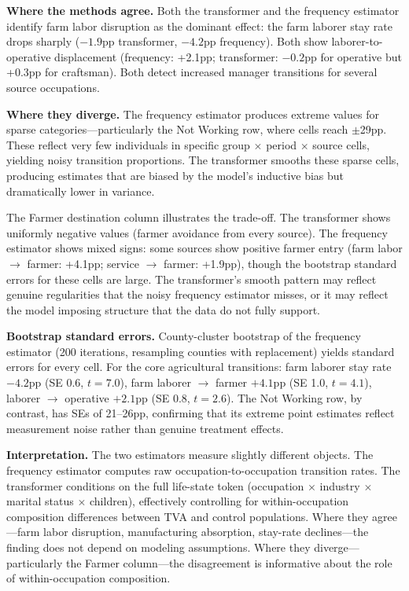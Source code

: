 \documentclass[12pt]{article}
\begin{document}
\textbf{Where the methods agree.} Both the transformer and the frequency estimator identify farm labor disruption as the dominant effect: the farm laborer stay rate drops sharply ($-1.9$pp transformer, $-4.2$pp frequency). Both show laborer-to-operative displacement (frequency: +2.1pp; transformer: $-0.2$pp for operative but +0.3pp for craftsman). Both detect increased manager transitions for several source occupations.

\textbf{Where they diverge.} The frequency estimator produces extreme values for sparse categories---particularly the Not Working row, where cells reach $\pm$29pp. These reflect very few individuals in specific group $\times$ period $\times$ source cells, yielding noisy transition proportions. The transformer smooths these sparse cells, producing estimates that are biased by the model's inductive bias but dramatically lower in variance.

The Farmer destination column illustrates the trade-off. The transformer shows uniformly negative values (farmer avoidance from every source). The frequency estimator shows mixed signs: some sources show positive farmer entry (farm labor $\to$ farmer: +4.1pp; service $\to$ farmer: +1.9pp), though the bootstrap standard errors for these cells are large. The transformer's smooth pattern may reflect genuine regularities that the noisy frequency estimator misses, or it may reflect the model imposing structure that the data do not fully support.

\textbf{Bootstrap standard errors.} County-cluster bootstrap of the frequency estimator (200 iterations, resampling counties with replacement) yields standard errors for every cell. For the core agricultural transitions: farm laborer stay rate $-4.2$pp (SE 0.6, $t = 7.0$), farm laborer $\to$ farmer $+4.1$pp (SE 1.0, $t = 4.1$), laborer $\to$ operative $+2.1$pp (SE 0.8, $t = 2.6$). The Not Working row, by contrast, has SEs of 21--26pp, confirming that its extreme point estimates reflect measurement noise rather than genuine treatment effects.

\textbf{Interpretation.} The two estimators measure slightly different objects. The frequency estimator computes raw occupation-to-occupation transition rates. The transformer conditions on the full life-state token (occupation $\times$ industry $\times$ marital status $\times$ children), effectively controlling for within-occupation composition differences between TVA and control populations. Where they agree---farm labor disruption, manufacturing absorption, stay-rate declines---the finding does not depend on modeling assumptions. Where they diverge---particularly the Farmer column---the disagreement is informative about the role of within-occupation composition.
\end{document}

